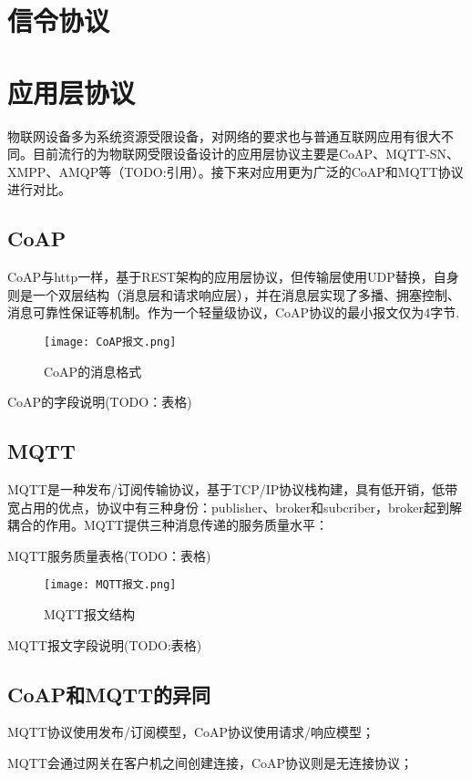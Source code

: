 \section{信令协议}

\section{应用层协议}

物联网设备多为系统资源受限设备，对网络的要求也与普通互联网应用有很大不同。目前流行的为物联网受限设备设计的应用层协议主要是CoAP、MQTT-SN、XMPP、AMQP等（TODO:引用）。接下来对应用更为广泛的CoAP和MQTT协议进行对比。

\subsection{CoAP}
CoAP与http一样，基于REST架构的应用层协议，但传输层使用UDP替换，自身则是一个双层结构（消息层和请求响应层），并在消息层实现了多播、拥塞控制、消息可靠性保证等机制。作为一个轻量级协议，CoAP协议的最小报文仅为4字节.

\begin{figure}[h]
	\texttt{[image: CoAP报文.png]}
	\caption{CoAP的消息格式}
	\label{CoAP报文}
\end{figure}

  CoAP的字段说明(TODO：表格)
\subsection{MQTT}

MQTT是一种发布/订阅传输协议，基于TCP/IP协议栈构建，具有低开销，低带宽占用的优点，协议中有三种身份：publisher、broker和subcriber，broker起到解耦合的作用。MQTT提供三种消息传递的服务质量水平：

MQTT服务质量表格(TODO：表格)

\begin{figure}[h]
	\texttt{[image: MQTT报文.png]}
	\caption{MQTT报文结构}
	\label{MQTT报文}
\end{figure}

MQTT报文字段说明(TODO:表格)

\subsection{CoAP和MQTT的异同}


  MQTT协议使用发布/订阅模型，CoAP协议使用请求/响应模型；

  MQTT会通过网关在客户机之间创建连接，CoAP协议则是无连接协议；

